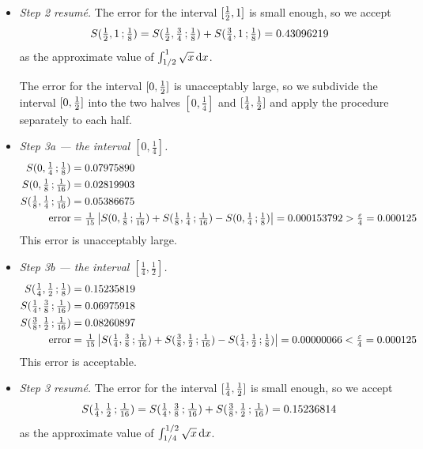 \begin{eg}
\begin{itemize}
\item\emph{Step 2 resum\'e.} 
The error for the interval
$[\tfrac{1}{2},1]$ is small enough, so we accept
\begin{equation*}
S(\tfrac{1}{2},1\,;\tfrac{1}{8})
  = S(\tfrac{1}{2},\tfrac{3}{4}\,;\tfrac{1}{8})
   + S(\tfrac{3}{4},1\,;\tfrac{1}{8})
  = 0.43096219
\end{equation*}
as the approximate value of $\int_{1/2}^1\sqrt{x}\,\mathrm{d}x$.

The error for the interval $[0,\tfrac{1}{2}]$ is
unacceptably large, so we subdivide the interval $[0,\tfrac{1}{2}]$ into
the two halves $[0,\tfrac{1}{4}]$ and $[\tfrac{1}{4},\tfrac{1}{2}]$
and apply the procedure separately to each half. 

\item \emph{Step 3a --- the interval $[0,\tfrac{1}{4}]$.}
\begin{align*}
S(0,\tfrac{1}{4}\,;\tfrac{1}{8})&= 0.07975890  \\
S(0,\tfrac{1}{8}\,;\tfrac{1}{16})&= 0.02819903   \\
S(\tfrac{1}{8},\tfrac{1}{4}\,;\tfrac{1}{16})&= 0.05386675   \\
\text{error}&=\tfrac{1}{15}\left|S(0,\tfrac{1}{8}\,;\tfrac{1}{16})
                              +S(\tfrac{1}{8},\tfrac{1}{4}\,;\tfrac{1}{16})
                              -S(0,\tfrac{1}{4}\,;\tfrac{1}{8})\right|
             = 0.000153792 > \tfrac{\varepsilon}{4} = 0.000125
\end{align*}
This error is unacceptably large.

\item \emph{Step 3b --- the interval $[\tfrac{1}{4},\tfrac{1}{2}]$.}
\begin{align*}
S(\tfrac{1}{4},\tfrac{1}{2}\,;\tfrac{1}{8})&= 0.15235819   \\
S(\tfrac{1}{4},\tfrac{3}{8}\,;\tfrac{1}{16})&= 0.06975918  \\
S(\tfrac{3}{8},\tfrac{1}{2}\,;\tfrac{1}{16})&= 0.08260897   \\
\text{error}&=\tfrac{1}{15}\left|S(\tfrac{1}{4},\tfrac{3}{8}\,;\tfrac{1}{16})
                              +S(\tfrac{3}{8},\tfrac{1}{2}\,;\tfrac{1}{16})
                              -S(\tfrac{1}{4},\tfrac{1}{2}\,;\tfrac{1}{8})\right|
             =  0.00000066  <\tfrac{\varepsilon}{4} = 0.000125
\end{align*}
This error is acceptable.

\item\emph{Step 3 resum\'e.}
 The error for the interval
$[\tfrac{1}{4},\tfrac{1}{2}]$ is small enough, so we accept
\begin{equation*}
S(\tfrac{1}{4},\tfrac{1}{2}\,;\tfrac{1}{16})
  = S(\tfrac{1}{4},\tfrac{3}{8}\,;\tfrac{1}{16})
   + S(\tfrac{3}{8},\tfrac{1}{2}\,;\tfrac{1}{16})
  = 0.15236814
\end{equation*}
as the approximate value of $\int_{1/4}^{1/2}\sqrt{x}\,\mathrm{d}x$.


\end{itemize}
\end{eg}
